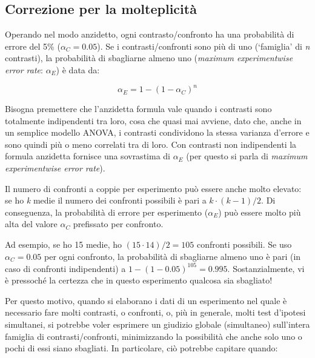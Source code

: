 \documentclass[
  12pt,
]{book}
\begin{document}
\hypertarget{correzione-per-la-molteplicituxe0}{%
\subsection{Correzione per la molteplicità}\label{correzione-per-la-molteplicituxe0}}

Operando nel modo anzidetto, ogni contrasto/confronto ha una probabilità di errore del 5\% (\(\alpha_C = 0.05\)). Se i contrasti/confronti sono più di uno (`famiglia' di \emph{n} contrasti), la probabilità di sbagliarne almeno uno (\emph{maximum experimentwise error rate}: \(\alpha_E\)) è data da:

\[\alpha_E = 1 - (1 - \alpha_C)^n\]

Bisogna premettere che l'anzidetta formula vale quando i contrasti sono totalmente indipendenti tra loro, cosa che quasi mai avviene, dato che, anche in un semplice modello ANOVA, i contrasti condividono la stessa varianza d'errore e sono quindi più o meno correlati tra di loro. Con contrasti non indipendenti la formula anzidetta fornisce una sovrastima di \(\alpha_E\) (per questo si parla di \emph{maximum experimentwise error rate}).

Il numero di confronti a coppie per esperimento può essere anche molto elevato: se ho \emph{k} medie il numero dei confronti possibili è pari a \(k \cdot (k-1)/2\). Di conseguenza, la probabilità di errore per esperimento (\(\alpha_E\)) può essere molto più alta del valore \(\alpha_C\) prefissato per confronto.

Ad esempio, se ho 15 medie, ho \((15 \cdot 14)/2 = 105\) confronti possibili. Se uso \(\alpha_C = 0.05\) per ogni confronto, la probabilità di sbagliarne almeno uno è pari (in caso di confronti indipendenti) a \(1 - (1 - 0.05)^105 = 0.995\). Sostanzialmente, vi è pressoché la certezza che in questo esperimento qualcosa sia sbagliato!

Per questo motivo, quando si elaborano i dati di un esperimento nel quale è necessario fare molti contrasti, o confronti, o, più in generale, molti test d'ipotesi simultanei, si potrebbe voler esprimere un giudizio globale (simultaneo) sull'intera famiglia di contrasti/confronti, minimizzando la possibilità che anche solo uno o pochi di essi siano sbagliati. In particolare, ciò potrebbe capitare quando:
\end{document}
